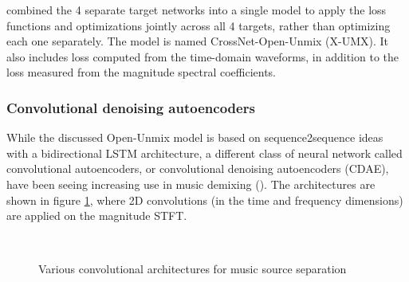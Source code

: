 \documentclass[report.tex]{subfiles}
\begin{document}
\textcite{xumx} combined the 4 separate target networks into a single model to apply the loss functions and optimizations jointly across all 4 targets, rather than optimizing each one separately. The model is named CrossNet-Open-Unmix (X-UMX). It also includes loss computed from the time-domain waveforms, in addition to the loss measured from the magnitude spectral coefficients.

\subsubsection{Convolutional denoising autoencoders}

While the discussed Open-Unmix model is based on sequence2sequence ideas with a bidirectional LSTM architecture, a different class of neural network called convolutional autoencoders, or convolutional denoising autoencoders (CDAE), have been seeing increasing use in music demixing (\cite{plumbley1, plumbley2}). The architectures are shown in figure \ref{fig:cdaes}, where 2D convolutions (in the time and frequency dimensions) are applied on the magnitude STFT.

\begin{figure}[ht]
	\centering
	\\
	\caption{Various convolutional architectures for music source separation}
	\label{fig:cdaes}
\end{figure}
\end{document}
